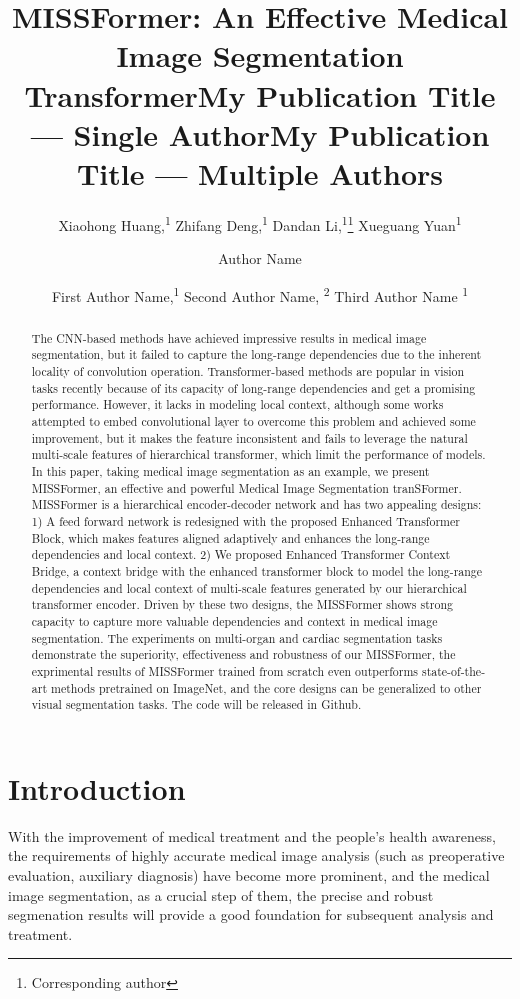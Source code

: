 \documentclass[letterpaper]{article} \usepackage{aaai22}  \usepackage{times}  \usepackage{helvet}  \usepackage{courier}  \usepackage[hyphens]{url}  \usepackage{graphicx} \urlstyle{rm} \def\UrlFont{\rm}  \usepackage{natbib}  \usepackage{caption} \DeclareCaptionStyle{ruled}{labelfont=normalfont,labelsep=colon,strut=off} \frenchspacing  \setlength{\pdfpagewidth}{8.5in}  \setlength{\pdfpageheight}{11in}  \usepackage{algorithm}
\title{MISSFormer: An Effective Medical Image Segmentation Transformer}
\author{
Xiaohong Huang,\textsuperscript{\rm 1}
	Zhifang Deng,\textsuperscript{\rm 1}
	Dandan Li,\textsuperscript{\rm 1}\thanks{Corresponding author}
	Xueguang Yuan\textsuperscript{\rm 1}
}
\title{My Publication Title --- Single Author}
\author {
    Author Name
}
\title{My Publication Title --- Multiple Authors}
\author {
First Author Name,\textsuperscript{\rm 1}
    Second Author Name, \textsuperscript{\rm 2}
    Third Author Name \textsuperscript{\rm 1}
}
\begin{document}
\maketitle

\begin{abstract}
The CNN-based methods have achieved impressive results in medical image segmentation, but it failed to capture the long-range dependencies due to the inherent locality of convolution operation. Transformer-based methods are popular in vision tasks recently because of its capacity of long-range dependencies and get a promising performance. However, it lacks in modeling local context, although some works attempted to embed convolutional layer to overcome this problem and achieved some improvement, but it makes the feature inconsistent and fails to leverage the natural multi-scale features of hierarchical transformer, which limit the performance of models. In this paper, taking medical image segmentation as an example, we present MISSFormer, an effective and powerful Medical Image Segmentation tranSFormer. MISSFormer is a hierarchical encoder-decoder network and has two appealing designs: 1) A feed forward network is redesigned with the proposed Enhanced Transformer Block, which makes features aligned adaptively and enhances the long-range dependencies and local context. 2) We proposed Enhanced Transformer Context Bridge, a context bridge with the enhanced transformer block to model the long-range dependencies and local context of multi-scale features generated by our hierarchical transformer encoder. Driven by these two designs, the MISSFormer shows strong capacity to capture more valuable dependencies and context in medical image segmentation. The experiments on multi-organ and cardiac segmentation tasks demonstrate the superiority, effectiveness and robustness of our MISSFormer, the exprimental results of MISSFormer trained from scratch even outperforms state-of-the-art methods pretrained on ImageNet, and the core designs can be generalized to other visual segmentation tasks. The code will be released in Github.
\end{abstract}

\section{Introduction}
\noindent With the improvement of medical treatment and the people's health awareness, the requirements of highly accurate medical image analysis (such as preoperative evaluation, auxiliary diagnosis) have become more prominent, and the medical image segmentation, as a crucial step of them, the precise and robust segmenation results will provide a good foundation for subsequent analysis and treatment.
\end{document}
